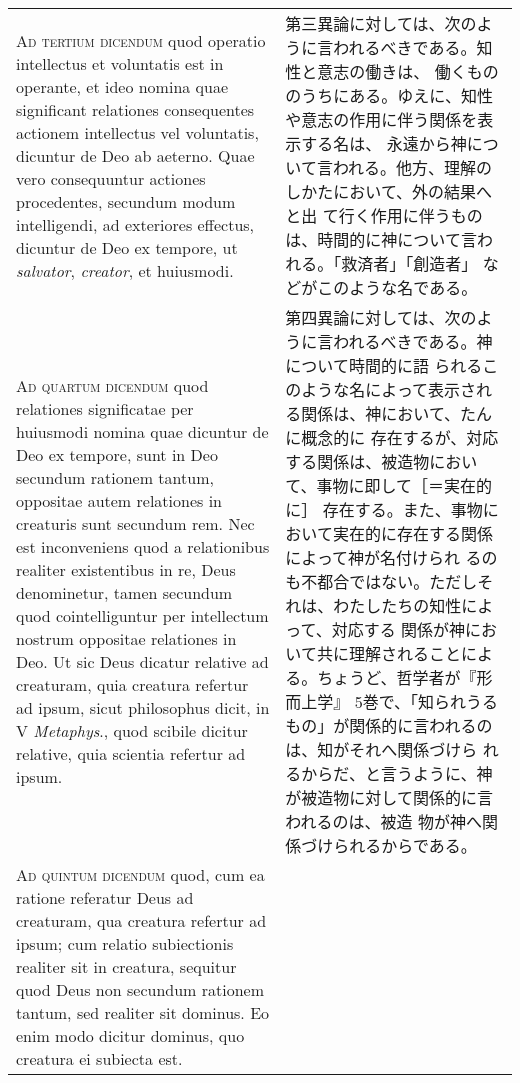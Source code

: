\documentclass[10pt]{jsarticle}
\begin{document}
\begin{longtable}{p{21em}p{21em}}
\\

{\scshape Ad tertium dicendum} quod operatio intellectus et voluntatis
est in operante, et ideo nomina quae significant relationes
consequentes actionem intellectus vel voluntatis, dicuntur de Deo ab
aeterno. Quae vero consequuntur actiones procedentes, secundum modum
intelligendi, ad exteriores effectus, dicuntur de Deo ex tempore, ut
{\itshape salvator}, {\itshape creator}, et huiusmodi.

&

第三異論に対しては、次のように言われるべきである。知性と意志の働きは、
働くもののうちにある。ゆえに、知性や意志の作用に伴う関係を表示する名は、
永遠から神について言われる。他方、理解のしかたにおいて、外の結果へと出
て行く作用に伴うものは、時間的に神について言われる。「救済者」「創造者」
などがこのような名である。

\\

{\scshape Ad quartum dicendum} quod relationes significatae per
huiusmodi nomina quae dicuntur de Deo ex tempore, sunt in Deo secundum
rationem tantum, oppositae autem relationes in creaturis sunt secundum
rem. Nec est inconveniens quod a relationibus realiter existentibus in
re, Deus denominetur, tamen secundum quod cointelliguntur per
intellectum nostrum oppositae relationes in Deo. Ut sic Deus dicatur
relative ad creaturam, quia creatura refertur ad ipsum, sicut
philosophus dicit, in V {\itshape Metaphys}., quod scibile dicitur
relative, quia scientia refertur ad ipsum.

&

第四異論に対しては、次のように言われるべきである。神について時間的に語
られるこのような名によって表示される関係は、神において、たんに概念的に
存在するが、対応する関係は、被造物において、事物に即して［＝実在的に］
存在する。また、事物において実在的に存在する関係によって神が名付けられ
るのも不都合ではない。ただしそれは、わたしたちの知性によって、対応する
関係が神において共に理解されることによる。ちょうど、哲学者が『形而上学』
5巻で、「知られうるもの」が関係的に言われるのは、知がそれへ関係づけら
れるからだ、と言うように、神が被造物に対して関係的に言われるのは、被造
物が神へ関係づけられるからである。

\\

{\scshape Ad quintum dicendum} quod, cum ea ratione referatur Deus ad
creaturam, qua creatura refertur ad ipsum; cum relatio subiectionis
realiter sit in creatura, sequitur quod Deus non secundum rationem
tantum, sed realiter sit dominus. Eo enim modo dicitur dominus, quo
creatura ei subiecta est.


\end{longtable}
\end{document}

